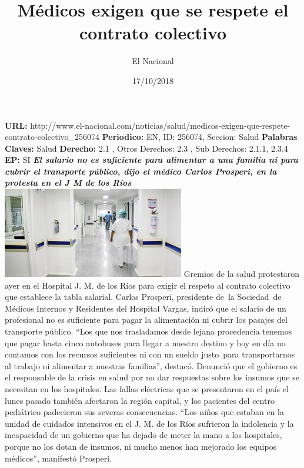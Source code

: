 \documentclass{article}%
\title{\textbf{Médicos exigen que se respete el contrato colectivo}}%
\author{El Nacional}%
\date{17/10/2018}%
\begin{document}
%
\normalsize%
\maketitle%
\textbf{URL: }%
http://www.el{-}nacional.com/noticias/salud/medicos{-}exigen{-}que{-}respete{-}contrato{-}colectivo\_256074\newline%
%
\textbf{Periodico: }%
EN, %
ID: %
256074, %
Seccion: %
Salud\newline%
%
\textbf{Palabras Claves: }%
Salud\newline%
%
\textbf{Derecho: }%
2.1%
, Otros Derechos: %
2.3%
, Sub Derechos: %
2.1.1, 2.3.4%
\newline%
%
\textbf{EP: }%
SI\newline%
\newline%
%
\textbf{\textit{El salario no es suficiente para alimentar a una familia ni para cubrir el transporte público, dijo el médico Carlos Prosperi, en la protesta en el J M de los Ríos}}%
\newline%
\newline%
%
\includegraphics[width=300px]{19.jpg}%
\newline%
%
Gremios de la salud protestaron ayer en el Hospital J. M. de los Ríos para exigir el respeto al contrato colectivo que establece la tabla salarial.%
\newline%
%
Carlos Prosperi, presidente de~la Sociedad~de Médicos Internos y Residentes del Hospital Vargas, indicó que el salario de un profesional no es suficiente para pagar la alimentación ni cubrir los pasajes del transporte público. “Los que nos trasladamos desde lejana procedencia tenemos que pagar hasta cinco autobuses para llegar a nuestro destino y hoy en día no contamos con los recursos suficientes ni con un sueldo justo~para transportarnos al trabajo ni alimentar a nuestras familias”, destacó.%
\newline%
%
Denunció que el gobierno es el responsable de la crisis en salud por no dar respuestas sobre los insumos que se necesitan en los hospitales.%
\newline%
%
Las fallas eléctricas que se presentaron en el país el lunes pasado también afectaron la región capital, y los pacientes del centro pediátrico padecieron sus severas consecuencias. “Los niños que estaban en la unidad de cuidados intensivos en el J. M. de los Ríos sufrieron la indolencia y la incapacidad de un gobierno que ha dejado de meter la mano a los hospitales, porque no los dotan de insumos, ni mucho menos han mejorado los equipos médicos”, manifestó Prosperi.%
\end{document}

